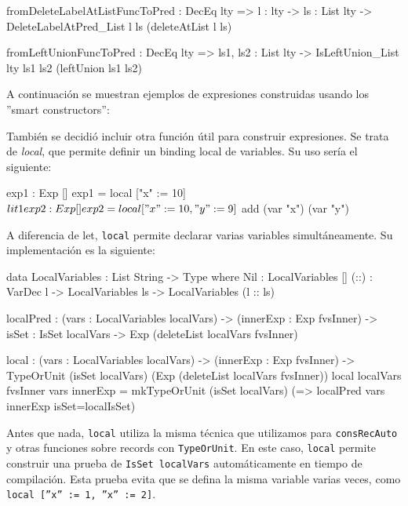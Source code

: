 \begin{code}
fromDeleteLabelAtListFuncToPred : DecEq lty => {l : lty} ->
  {ls : List lty} -> DeleteLabelAtPred_List l ls (deleteAtList l ls)

fromLeftUnionFuncToPred : DecEq lty => {ls1, ls2 : List lty} ->
  IsLeftUnion_List {lty} ls1 ls2 (leftUnion ls1 ls2)
\end{code}

A continuación se muestran ejemplos de expresiones construidas usando los ''smart constructors'':


También se decidió incluir otra función útil para construir expresiones. Se trata de \textit{local}, que permite definir un binding local de variables. Su uso sería el siguiente:

\begin{code}
exp1 : Exp []
exp1 = local ["x" := 10] $ lit 1

exp2 : Exp []
exp2 = local ["x" := 10, "y" := 9] $ add (var "x") (var "y")
\end{code}

A diferencia de let, \texttt{local} permite declarar varias variables simultáneamente. Su implementación es la siguiente:

\begin{code}
data LocalVariables : List String -> Type where
  Nil : LocalVariables []
  (::) : VarDec l -> LocalVariables ls ->
    LocalVariables (l :: ls)

localPred : (vars : LocalVariables localVars) ->
  (innerExp : Exp fvsInner) -> {isSet : IsSet localVars} ->
  Exp (deleteList localVars fvsInner)

local : (vars : LocalVariables localVars) -> (innerExp : Exp fvsInner) ->
  TypeOrUnit (isSet localVars) (Exp (deleteList localVars fvsInner))
local {localVars} {fvsInner} vars innerExp =
  mkTypeOrUnit (isSet localVars)
    (\localIsSet => localPred vars innerExp {isSet=localIsSet})
\end{code}

Antes que nada, \texttt{local} utiliza la misma técnica que utilizamos para \texttt{consRecAuto} y otras funciones sobre records con \texttt{TypeOrUnit}. En este caso, \texttt{local} permite construir una prueba de \texttt{IsSet localVars} automáticamente en tiempo de compilación. Esta prueba evita que se defina la misma variable varias veces, como \texttt{local [''x'' := 1, ''x'' := 2]}.

